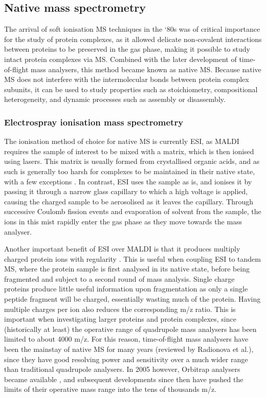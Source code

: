\documentclass[a4paper,11pt,twoside,openright]{scrbook}
\begin{document}
\subsection{Native mass spectrometry}
The arrival of soft ionisation MS techniques in the `80s was of critical
importance for the study of protein complexes, as it allowed delicate
non-covalent interactions between proteins to be preserved in the gas phase,
making it possible to study intact protein complexes via MS. Combined with the
later development of time-of-flight mass analysers, this method became known as
native MS. Because native MS does not interfere with the intermolecular bonds
between protein complex subunits, it can be used to study properties such as
stoichiometry, compositional heterogeneity, and dynamic processes such as
assembly or disassembly.

\subsubsection{Electrospray ionisation mass spectrometry}
The ionisation method of choice for native MS is currently ESI, as MALDI
requires the sample of interest to be mixed with a matrix, which is then ionised
using lasers. This matrix is usually formed from crystallised organic acids, and
as such is generally too harsh for complexes to be maintained in their native
state, with a few exceptions \cite{Song2007}. In contrast, ESI uses the sample
as is, and ionises it by passing it through a narrow glass capillary to which a
high voltage is applied, causing the charged sample to be aerosolised as it
leaves the capillary. Through successive Coulomb fission events and evaporation
of solvent from the sample, the ions in this mist rapidly enter the gas phase as
they move towards the mass analyser.

Another important benefit of ESI over MALDI is that it produces multiply charged
protein ions with regularity \cite{Krusemark2009}. This is useful when coupling
ESI to tandem MS, where the protein sample is first analysed in its native
state, before being fragmented and subject to a second round of mass analysis.
Single charge proteins produce little useful information upon fragmentation as
only a single peptide fragment will be charged, essentially wasting much of the
protein. Having multiple charges per ion also reduces the corresponding m/z
ratio. This is important when investigating larger proteins and protein
complexes, since (historically at least) the operative range of quadrupole mass
analysers has been limited to about 4000 m/z. For this reason, time-of-flight
mass analysers have been the mainstay of native MS for many years (reviewed by
Radionova et al.\cite{Radionova2016}), since they have good resolving power and
sensitivity over a much wider range than traditional quadrupole analysers. In
2005 however, Orbitrap analysers became available \cite{Hu2005}, and subsequent
developments since then have pushed the limits of their operative mass range
into the tens of thousands m/z.
\end{document}
